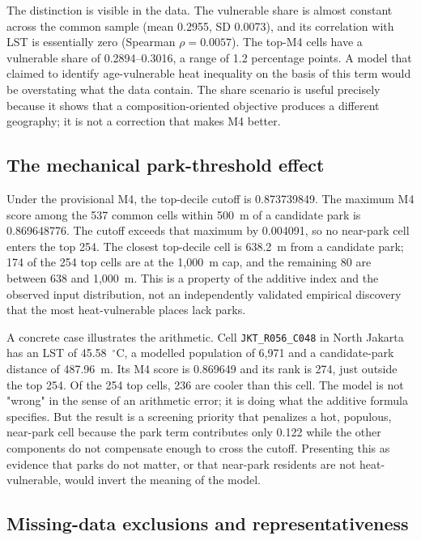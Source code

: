 \documentclass[times,twoside]{_Templates/MultiTargetManuscript}
\begin{document}
The distinction is visible in the data. The vulnerable share is almost constant
across the common sample (mean 0.2955, SD 0.0073), and its correlation with LST
is essentially zero (Spearman $\rho=0.0057$). The top-M4 cells have a vulnerable
share of 0.2894--0.3016, a range of 1.2 percentage points. A model that claimed to
identify age-vulnerable heat inequality on the basis of this term would be
overstating what the data contain. The share scenario is useful precisely because
it shows that a composition-oriented objective produces a different geography;
it is not a correction that makes M4 better.

\subsection{The mechanical park-threshold effect}

Under the provisional M4, the top-decile cutoff is 0.873739849. The maximum M4
score among the 537 common cells within 500~m of a candidate park is 0.869648776.
The cutoff exceeds that maximum by 0.004091, so no near-park cell enters the top
254. The closest top-decile cell is 638.2~m from a candidate park; 174 of the 254
top cells are at the 1,000~m cap, and the remaining 80 are between 638 and
1,000~m. This is a property of the additive index and the observed input
distribution, not an independently validated empirical discovery that the most
heat-vulnerable places lack parks.

A concrete case illustrates the arithmetic. Cell \texttt{JKT\_R056\_C048} in
North Jakarta has an LST of 45.58~$^\circ$C, a modelled population of 6,971 and a
candidate-park distance of 487.96~m. Its M4 score is 0.869649 and its rank is 274,
just outside the top 254. Of the 254 top cells, 236 are cooler than this cell.
The model is not "wrong" in the sense of an arithmetic error; it is doing what
the additive formula specifies. But the result is a screening priority that
penalizes a hot, populous, near-park cell because the park term contributes only
0.122 while the other components do not compensate enough to cross the cutoff.
Presenting this as evidence that parks do not matter, or that near-park
residents are not heat-vulnerable, would invert the meaning of the model.

\subsection{Missing-data exclusions and representativeness}
\end{document}
